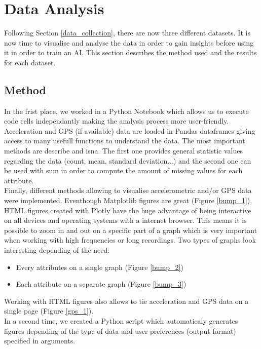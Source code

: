 \section{Data Analysis}
\label{data_analysis}
Following Section \ref{data_collection}, there are now three different datasets. It is now time to visualise and analyse the data in order to gain insights before using it in order to train an AI. This section describes the method used and the results for each dataset.

\subsection{Method}
In the frist place, we worked in a Python Notebook which allows us to execute code cells independantly making the analysis process more user-friendly.\\
Acceleration and GPS (if available) data are loaded in Pandas dataframes giving access to many usefull functions to understand the data. The most important methods are \textsf{describe} and \textsf{isna}. The first one provides general statistic values regarding the data (count, mean, standard deviation...) and the second one can be used with \textsf{sum} in order to compute the amount of missing values for each attribute.\\
Finally, different methods allowing to visualise accelerometric and/or GPS data were implemented. Eventhough Matplotlib figures are great (Figure \ref{bump_1}), HTML figures created with Plotly have the huge advantage of being interactive on all devices and operating systems with a internet browser. This means it is possible to zoom in and out on a specific part of a graph which is very important when working with high frequencies or long recordings. Two types of graphs look interesting depending of the need:
\begin{itemize}
    \item Every attributes on a single graph (Figure \ref{bump_2})
    \item Each attribute on a separate graph (Figure \ref{bump_3})
\end{itemize}
Working with HTML figures also allows to tie acceleration and GPS data on a single page (Figure \ref{gps_1}).\\

In a second time, we created a Python script which automaticaly generates figures depending of the type of data and user preferences (output format) specified in arguments.\\

